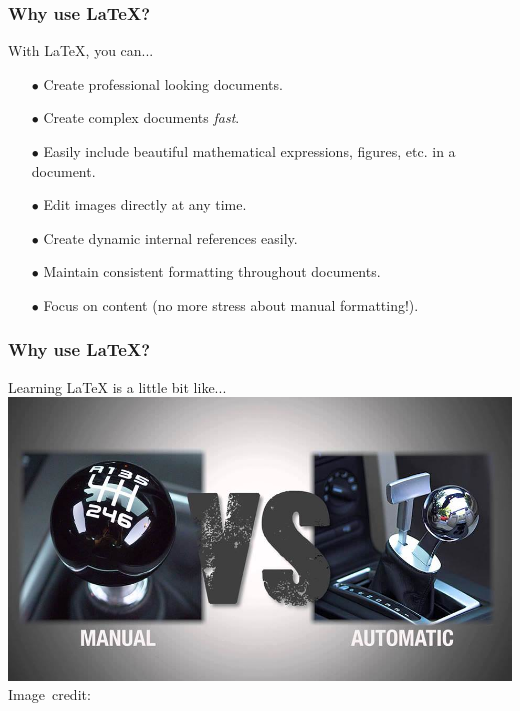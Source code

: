 \begin{frame}[fragile]
\frametitle{Why use \LaTeX{}?}
    With \LaTeX{}, you can... \pause
    \begin{itemize}
        \item[$\bullet$] Create professional looking documents. \pause
        \item[$\bullet$] Create complex documents \emph{fast}. \pause
        \item[$\bullet$] Easily include beautiful mathematical expressions, figures, etc. in a document. \pause
        \item[$\bullet$] Edit images directly at any time. \pause
        \item[$\bullet$] Create dynamic internal references easily. \pause
        \item[$\bullet$] Maintain consistent formatting throughout documents. \pause
        \item[$\bullet$] Focus on content (no more stress about manual formatting!).
    \end{itemize}
\end{frame}

\begin{frame}[fragile]
\frametitle{Why use \LaTeX{}?}
    Learning \LaTeX{} is a little bit like... \\ \pause
    \vspace{0.1cm}
    \includegraphics[width=\linewidth]{img/man_auto.jpg}
    \hspace*{15pt}\hbox{\tiny Image credit:}
\end{frame}


